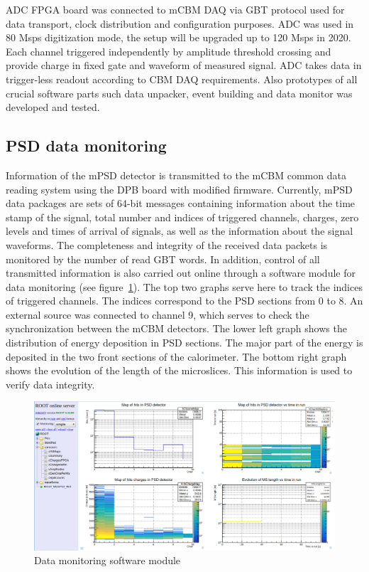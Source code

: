 \documentclass[a4paper,11pt]{article}
\begin{document}
ADC FPGA board was connected to mCBM DAQ via GBT protocol used for data transport, clock distribution and configuration purposes. ADC was used in 80 Msps digitization mode, the setup will be upgraded up to 120 Msps in 2020. Each channel triggered independently by amplitude threshold crossing and provide charge in fixed gate and waveform of measured signal. ADC takes data in trigger-less readout according to CBM DAQ requirements. Also prototypes of all crucial software parts such data unpacker, event building and data monitor was developed and tested.

\subsection{PSD data monitoring}
Information of the mPSD detector is transmitted to the mCBM common data reading system using the DPB board with modified firmware. Currently, mPSD data packages are sets of 64-bit messages containing information about the time stamp of the signal, total number and indices of triggered channels, charges, zero levels and times of arrival of signals, as well as the information about the signal waveforms.
The completeness and integrity of the received data packets is monitored by the number of read GBT words. In addition, control of all transmitted information is also carried out online through a software module for data monitoring (see figure~\ref{fig:5}). The top two graphs serve here to track the indices of triggered channels. The indices correspond to the PSD sections from 0 to 8. An external source was connected to channel 9, which serves to check the synchronization between the mCBM detectors. The lower left graph shows the distribution of energy deposition in PSD sections. The major part of the energy is deposited in the two front sections of the calorimeter. The bottom right graph shows the evolution of the length of the microslices. This information is used to verify data integrity.

\begin{figure}[htbp]
\centering %
\includegraphics[width=\textwidth]{run582.png}
\caption{\label{fig:5} Data monitoring software module}
\end{figure}
\end{document}
